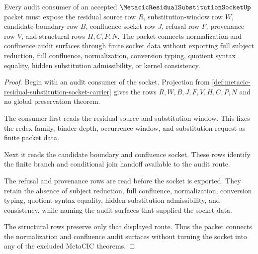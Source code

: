 \begin{theorem}
\label{thm:metacic-residual-substitution-socket-audit-route}
Every audit consumer of an accepted $\MetacicResidualSubstitutionSocketUp$ packet must expose the residual source row $R$, substitution-window row $W$, candidate-boundary row $B$, confluence socket row $J$, refusal row $F$, provenance row $V$, and structural rows $H,C,P,N$. The packet connects normalization and confluence audit surfaces through finite socket data without exporting full subject reduction, full confluence, normalization, conversion typing, quotient syntax equality, hidden substitution admissibility, or kernel consistency.
\end{theorem}
\begin{proof}
Begin with an audit consumer of the socket. Projection from \autoref{def:metacic-residual-substitution-socket-carrier} gives the rows $R,W,B,J,F,V,H,C,P,N$ and no global preservation theorem.

The consumer first reads the residual source and substitution window. This fixes the redex family, binder depth, occurrence window, and substitution request as finite packet data.

Next it reads the candidate boundary and confluence socket. These rows identify the finite branch and conditional join handoff available to the audit route.

The refusal and provenance rows are read before the socket is exported. They retain the absence of subject reduction, full confluence, normalization, conversion typing, quotient syntax equality, hidden substitution admissibility, and consistency, while naming the audit surfaces that supplied the socket data.

The structural rows preserve only that displayed route. Thus the packet connects the normalization and confluence audit surfaces without turning the socket into any of the excluded MetaCIC theorems.
\end{proof}



